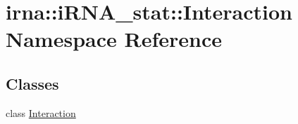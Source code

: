 \hypertarget{namespaceirna_1_1iRNA__stat_1_1Interaction}{
\section{irna\-:\-:i\-R\-N\-A\-\_\-stat\-:\-:\-Interaction \-Namespace \-Reference}
\label{namespaceirna_1_1iRNA__stat_1_1Interaction}
}
\subsection*{\-Classes}
\begin{DoxyCompactItemize}
\item 
class \hyperlink{classirna_1_1iRNA__stat_1_1Interaction_1_1Interaction}{\-Interaction}
\end{DoxyCompactItemize}
